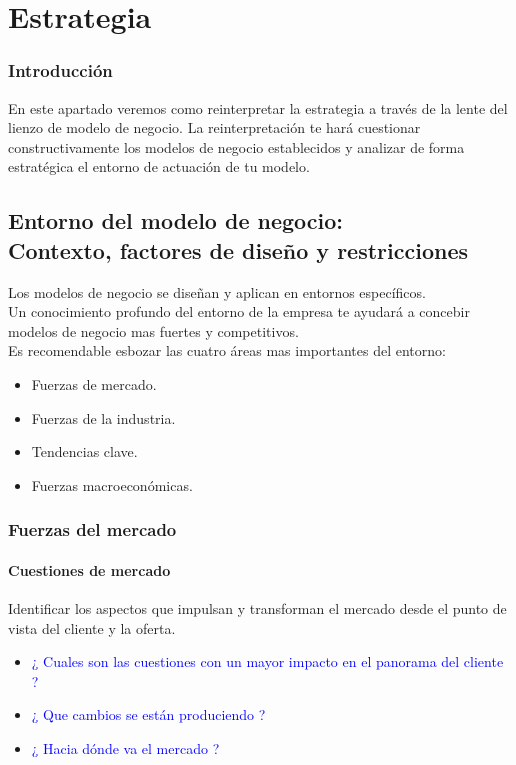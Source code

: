 \documentclass[11pt]{book}
\begin{document}
\part{Estrategia}
\section{Introducción}
En este apartado veremos como reinterpretar la estrategia a través de la lente del lienzo de modelo de negocio. La reinterpretación te hará cuestionar constructivamente los modelos de negocio establecidos y analizar de forma estratégica el entorno de actuación de tu modelo.
\chapter{Entorno del modelo de negocio:\\ Contexto, factores de diseño y restricciones}
Los modelos de negocio se diseñan y aplican en entornos específicos.
\\ Un conocimiento profundo del entorno de la empresa te ayudará a concebir modelos de negocio mas fuertes y competitivos.\\
Es recomendable esbozar las cuatro áreas mas importantes del entorno:
\begin{itemize}
\item Fuerzas de mercado.
\item Fuerzas de la industria.
\item Tendencias clave.
\item Fuerzas macroeconómicas.
\end{itemize}
\section{Fuerzas del mercado}
\subsection{Cuestiones de mercado}
Identificar los aspectos que impulsan y transforman el mercado desde el punto de vista del cliente y la oferta.

\begin{itemize}
\item\textcolor{blue}{¿ Cuales son las cuestiones con un mayor impacto en el panorama del cliente ?}
\item\textcolor{blue}{¿ Que cambios se están produciendo ?}
\item\textcolor{blue}{¿ Hacia dónde va el mercado ?}
\end{itemize}
\end{document}
